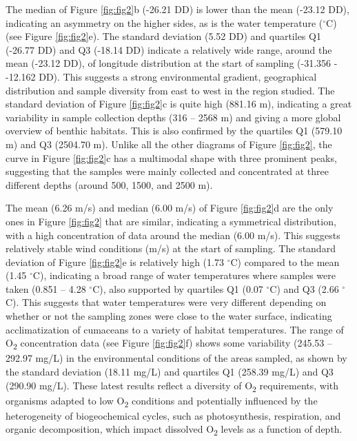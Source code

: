 The median of Figure \ref{fig:fig2}b (-26.21 DD) is lower than the mean (-23.12 DD), indicating an asymmetry on the higher sides, as is the water temperature ($^\circ$C) (see Figure \ref{fig:fig2}e). The standard deviation (5.52 DD) and quartiles Q1 (-26.77 DD) and Q3 (-18.14 DD) indicate a relatively wide range, around the mean (-23.12 DD), of longitude distribution at the start of sampling (-31.356 - -12.162 DD). This suggests a strong environmental gradient, geographical distribution and sample diversity from east to west in the region studied. The standard deviation of Figure \ref{fig:fig2}c is quite high (881.16 m), indicating a great variability in sample collection depths (316 – 2568 m) and giving a more global overview of benthic habitats. This is also confirmed by the quartiles Q1 (579.10 m) and Q3 (2504.70 m). Unlike all the other diagrams of Figure \ref{fig:fig2}, the curve in Figure \ref{fig:fig2}c has a multimodal shape with three prominent peaks, suggesting that the samples were mainly collected and concentrated at three different depths (around 500, 1500, and 2500 m).

The mean (6.26 m/s) and median (6.00 m/s) of Figure \ref{fig:fig2}d are the only ones in Figure \ref{fig:fig2} that are similar, indicating a symmetrical distribution, with a high concentration of data around the median (6.00 m/s). This suggests relatively stable wind conditions (m/s) at the start of sampling. The standard deviation of Figure \ref{fig:fig2}e is relatively high (1.73 $^\circ$C) compared to the mean (1.45 $^\circ$C), indicating a broad range of water temperatures where samples were taken (0.851 – 4.28 $^\circ$C), also supported by quartiles Q1 (0.07 $^\circ$C) and Q3 (2.66 $^\circ$C). This suggests that water temperatures were very different depending on whether or not the sampling zones were close to the water surface, indicating acclimatization of cumaceans to a variety of habitat temperatures. The range of O\textsubscript{2} concentration data (see Figure \ref{fig:fig2}f) shows some variability (245.53 – 292.97 mg/L) in the environmental conditions of the areas sampled, as shown by the standard deviation (18.11 mg/L) and quartiles Q1 (258.39 mg/L) and Q3 (290.90 mg/L). These latest results reflect a diversity of O\textsubscript{2} requirements, with organisms adapted to low O\textsubscript{2} conditions and potentially influenced by the heterogeneity of biogeochemical cycles, such as photosynthesis, respiration, and organic decomposition, which impact dissolved O\textsubscript{2} levels as a function of depth.


